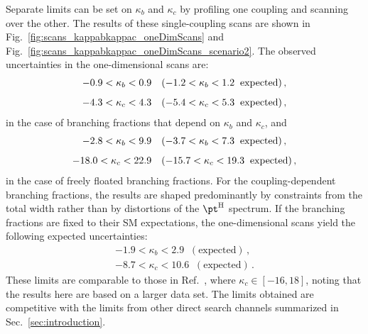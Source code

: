 Separate limits can be set on $\kappa_b$ and $\kappa_c$ by profiling one coupling and scanning over the other.
% 
% 
The results of these single-coupling scans are shown in Fig.~\ref{fig:scans_kappabkappac_oneDimScans} and Fig.~\ref{fig:scans_kappabkappac_oneDimScans_scenario2}.
% 
The observed uncertainties in the one-dimensional scans are:
% 
\begin{equation}
\label{eq:kappasensitivity}
\begin{array}{c}
-0.9 < \kappa_b < 0.9  \quad(-1.2 < \kappa_b < 1.2 \;\; \text{expected})  \,,
\\[8pt]
-4.3 < \kappa_c < 4.3 \quad(-5.4 < \kappa_c < 5.3 \;\; \text{expected})
\,,
\end{array}
\end{equation}
% 
in the case of branching fractions that depend on $\kappa_b$ and $\kappa_c$, and
% 
\begin{equation}
\label{eq:kappasensitivity}
\begin{array}{c}
-2.8 < \kappa_b < 9.9  \quad(-3.7 < \kappa_b < 7.3 \;\; \text{expected})  \,,
\\[8pt]
-18.0 < \kappa_c < 22.9 \quad(-15.7 < \kappa_c < 19.3 \;\; \text{expected})
\,,
\end{array}
\end{equation}
% 
in the case of freely floated branching fractions.
% 
For the coupling-dependent branching fractions, the results are shaped predominantly by constraints from the total width rather than by distortions of the $\pth$ spectrum.
% 
If the branching fractions are fixed to their SM expectations, the one-dimensional scans yield the following expected uncertainties:
% 
\begin{equation}
\label{eq:kappasensitivity_fixedSMBRs}
\begin{array}{c}
-1.9 < \kappa_b < 2.9 \;\; (\text{expected})  \,,
 \\[8pt]
-8.7 < \kappa_c < 10.6 \;\; (\text{expected})
\,.
\end{array}
\end{equation}
% 
These limits are comparable to those in Ref.~\cite{Bishara:2016jga}, where $\kappa_c \in [ -16, 18 ]$, noting that the results here are based on a larger data set.
% 
The limits obtained are competitive with the limits from other direct search channels summarized in Sec.~\ref{sec:introduction}.


